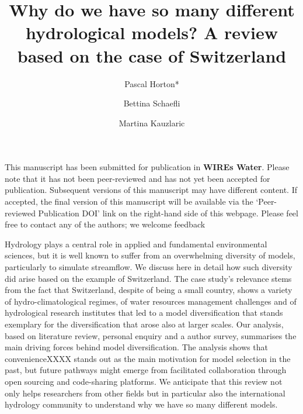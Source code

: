\documentclass[10pt,a4paper]{article}
\renewenvironment{abstract}
 {{\bfseries\noindent{\abstractname}\par\nobreak}\footnotesize}
 {\bigskip}
\begin{document}
\title{Why do we have so many different hydrological models? A review based on the case of Switzerland}


\author[1]{Pascal Horton*}
\author[1]{Bettina Schaefli}
\author[1]{Martina Kauzlaric}


 \date{}


\ifdefined\preprint
\setcounter{page}{0}
\hrulefill

This manuscript has been submitted for publication in \textbf{WIREs Water}. Please note that it has not been peer-reviewed and has not yet been accepted for publication. Subsequent versions of this manuscript may have different content. If accepted, the final version of this manuscript will be available via the ‘Peer-reviewed Publication DOI' link on the right-hand side of this webpage. Please feel free to contact any of the authors; we welcome feedback

\hrulefill
\newpage
\fi

\begingroup
\maketitle
\endgroup




\begin{abstract}
Hydrology plays a central role in applied and fundamental environmental sciences, but it is well known to suffer from an overwhelming diversity of models, particularly to simulate streamflow. We discuss here in detail how such diversity did arise based on the example of Switzerland. The case study's relevance stems from the fact that Switzerland, despite of being a small country, shows a variety of hydro-climatological regimes, of water resources management challenges and of hydrological research institutes that led to a model diversification that stands exemplary for the diversification that arose also at larger scales. Our analysis, based on literature review, personal enquiry and a author survey, summarises the main driving forces behind model diversification. The analysis shows that convenienceXXXX stands out as the main motivation for model selection in the past, but future pathways might emerge from facilitated collaboration through open sourcing and code-sharing platforms. We anticipate that this review not only helps researchers from other fields but in particular also the international hydrology community to understand why we have so many different models.
\end{abstract}%
\end{document}
